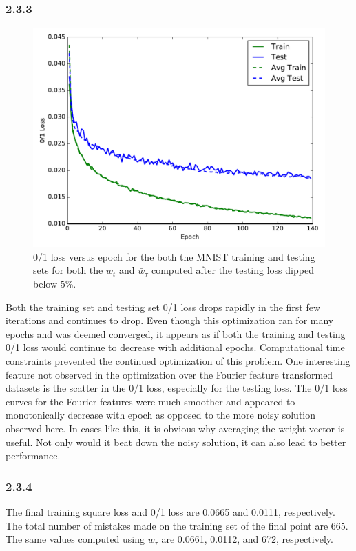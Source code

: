 \documentclass[12pt]{amsart}
\begin{document}
\subsubsection*{2.3.3}
\begin{figure}[H]
	\includegraphics[width=\columnwidth]{nn_01_loss_masked.pdf}
    \caption{0/1 loss versus epoch for the both the MNIST training and testing sets for both the $w_t$ and $\bar{w}_{\tau}$ computed after the testing loss dipped below $5\%$.}
    \label{fig:nn_01_loss_masked}
\end{figure}
Both the training set and testing set 0/1 loss drops rapidly in the first few iterations and continues to drop.  Even though this optimization ran for many epochs and was deemed converged, it appears as if both the training and testing 0/1 loss would continue to decrease with additional epochs.  Computational time constraints prevented the continued optimization of this problem.  One interesting feature not observed in the optimization over the Fourier feature transformed datasets is the scatter in the 0/1 loss, especially for the testing loss.  The 0/1 loss curves for the Fourier features were much smoother and appeared to monotonically decrease with epoch as opposed to the more noisy solution observed here.  In cases like this, it is obvious why averaging the weight vector is useful.  Not only would it beat down the noisy solution, it can also lead to better performance.

\subsubsection*{2.3.4}
The final training square loss and 0/1 loss are 0.0665 and 0.0111, respectively.  The total number of mistakes made on the training set of the final point are 665.  The same values computed using $\bar{w}_{\tau}$ are 0.0661, 0.0112, and 672, respectively.
\end{document}
